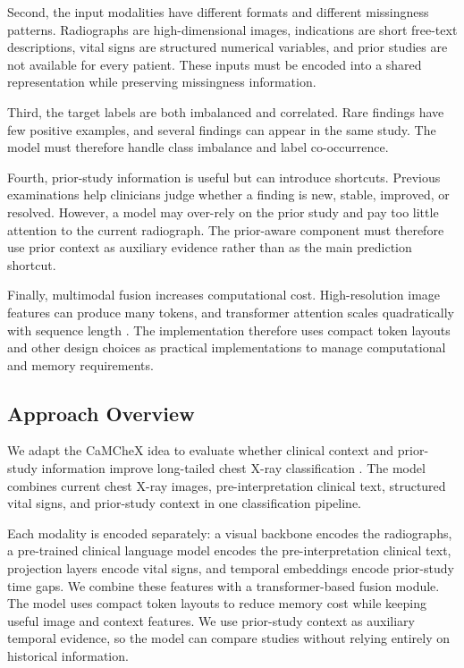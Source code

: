 Second, the input modalities have different formats and different missingness patterns. Radiographs are high-dimensional images, indications are short free-text descriptions, vital signs are structured numerical variables, and prior studies are not available for every patient. These inputs must be encoded into a shared representation while preserving missingness information.

Third, the target labels are both imbalanced and correlated. Rare findings have few positive examples, and several findings can appear in the same study. The model must therefore handle class imbalance and label co-occurrence.

Fourth, prior-study information is useful but can introduce shortcuts. Previous examinations help clinicians judge whether a finding is new, stable, improved, or resolved. However, a model may over-rely on the prior study and pay too little attention to the current radiograph. The prior-aware component must therefore use prior context as auxiliary evidence rather than as the main prediction shortcut.

Finally, multimodal fusion increases computational cost. High-resolution image features can produce many tokens, and transformer attention scales quadratically with sequence length \cite{vaswani2017attention}. The implementation therefore uses compact token layouts and other design choices as practical implementations to manage computational and memory requirements.

\subsection{Approach Overview}\label{subsec}

We adapt the CaMCheX idea to evaluate whether clinical context and prior-study information improve long-tailed chest X-ray classification \cite{sloan2025camchex}. The model combines current chest X-ray images, pre-interpretation clinical text, structured vital signs, and prior-study context in one classification pipeline.

Each modality is encoded separately: a visual backbone encodes the radiographs, a pre-trained clinical language model encodes the pre-interpretation clinical text, projection layers encode vital signs, and temporal embeddings encode prior-study time gaps. We combine these features with a transformer-based fusion module. The model uses compact token layouts to reduce memory cost while keeping useful image and context features. We use prior-study context as auxiliary temporal evidence, so the model can compare studies without relying entirely on historical information.

